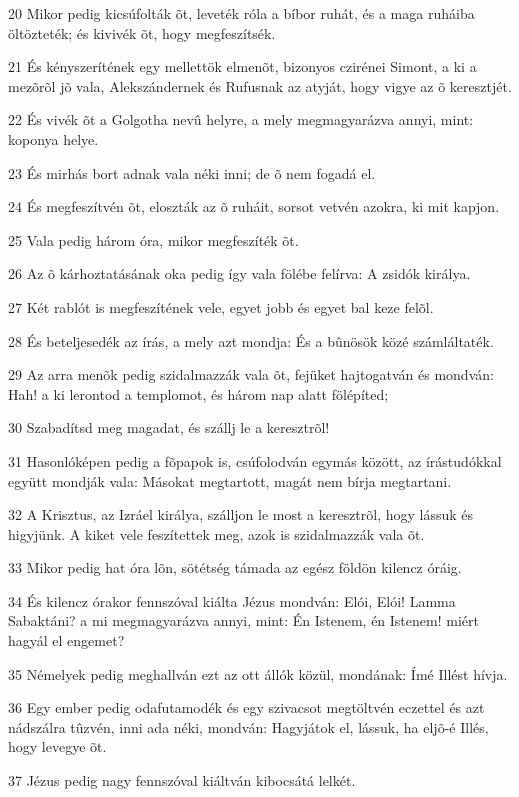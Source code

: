 \par 20 Mikor pedig kicsúfolták õt, leveték róla a bíbor ruhát, és a maga ruháiba öltözteték; és kivivék õt, hogy megfeszítsék.
\par 21 És kényszerítének egy mellettök elmenõt, bizonyos czirénei Simont, a ki a mezõrõl jõ vala, Alekszándernek és  Rufusnak az atyját, hogy vigye az õ keresztjét.
\par 22 És vivék õt a Golgotha nevû helyre, a mely megmagyarázva annyi, mint: koponya helye.
\par 23 És mirhás bort adnak vala néki inni; de õ nem fogadá el.
\par 24 És megfeszítvén õt, eloszták az õ ruháit, sorsot vetvén azokra, ki mit kapjon.
\par 25 Vala pedig három óra, mikor megfeszíték õt.
\par 26 Az õ kárhoztatásának oka pedig így vala fölébe felírva: A zsidók királya.
\par 27 Két rablót is megfeszítének vele, egyet jobb és egyet bal keze felõl.
\par 28 És beteljesedék az írás, a mely azt mondja: És a bûnösök közé számláltaték.
\par 29 Az arra menõk pedig szidalmazzák vala õt, fejüket hajtogatván és mondván: Hah! a ki lerontod a templomot, és három nap alatt fölépíted;
\par 30 Szabadítsd meg magadat, és szállj le a keresztrõl!
\par 31 Hasonlóképen pedig a fõpapok is, csúfolodván egymás között, az írástudókkal együtt mondják vala: Másokat megtartott, magát nem bírja megtartani.
\par 32 A Krisztus, az Izráel királya, szálljon le most a keresztrõl, hogy lássuk és higyjünk. A kiket vele feszítettek meg, azok is szidalmazzák vala õt.
\par 33 Mikor pedig hat óra lõn, sötétség támada az egész földön kilencz óráig.
\par 34 És kilencz órakor fennszóval kiálta Jézus mondván: Elói, Elói! Lamma Sabaktáni? a mi megmagyarázva annyi, mint: Én Istenem, én Istenem! miért hagyál el engemet?
\par 35 Némelyek pedig meghallván ezt az ott állók közül, mondának: Ímé Illést hívja.
\par 36 Egy ember pedig odafutamodék és egy szivacsot megtöltvén eczettel és azt nádszálra tûzvén, inni ada néki, mondván: Hagyjátok el, lássuk, ha eljõ-é Illés, hogy levegye õt.
\par 37 Jézus pedig nagy fennszóval kiáltván kibocsátá lelkét.
